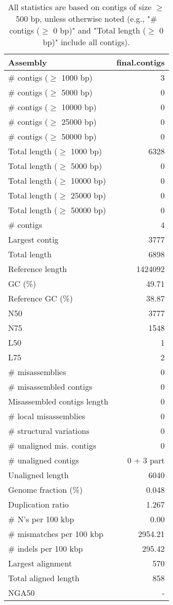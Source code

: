 \documentclass[12pt,a4paper]{article}
\begin{document}
\begin{table}[ht]
\begin{center}
\caption{All statistics are based on contigs of size $\geq$ 500 bp, unless otherwise noted (e.g., "\# contigs ($\geq$ 0 bp)" and "Total length ($\geq$ 0 bp)" include all contigs).}
\begin{tabular}{|l*{1}{|r}|}
\hline
Assembly & final.contigs \\ \hline
\# contigs ($\geq$ 1000 bp) & 3 \\ \hline
\# contigs ($\geq$ 5000 bp) & 0 \\ \hline
\# contigs ($\geq$ 10000 bp) & 0 \\ \hline
\# contigs ($\geq$ 25000 bp) & 0 \\ \hline
\# contigs ($\geq$ 50000 bp) & 0 \\ \hline
Total length ($\geq$ 1000 bp) & 6328 \\ \hline
Total length ($\geq$ 5000 bp) & 0 \\ \hline
Total length ($\geq$ 10000 bp) & 0 \\ \hline
Total length ($\geq$ 25000 bp) & 0 \\ \hline
Total length ($\geq$ 50000 bp) & 0 \\ \hline
\# contigs & 4 \\ \hline
Largest contig & 3777 \\ \hline
Total length & 6898 \\ \hline
Reference length & 1424092 \\ \hline
GC (\%) & 49.71 \\ \hline
Reference GC (\%) & 38.87 \\ \hline
N50 & 3777 \\ \hline
N75 & 1548 \\ \hline
L50 & 1 \\ \hline
L75 & 2 \\ \hline
\# misassemblies & 0 \\ \hline
\# misassembled contigs & 0 \\ \hline
Misassembled contigs length & 0 \\ \hline
\# local misassemblies & 0 \\ \hline
\# structural variations & 0 \\ \hline
\# unaligned mis. contigs & 0 \\ \hline
\# unaligned contigs & 0 + 3 part \\ \hline
Unaligned length & 6040 \\ \hline
Genome fraction (\%) & 0.048 \\ \hline
Duplication ratio & 1.267 \\ \hline
\# N's per 100 kbp & 0.00 \\ \hline
\# mismatches per 100 kbp & 2954.21 \\ \hline
\# indels per 100 kbp & 295.42 \\ \hline
Largest alignment & 570 \\ \hline
Total aligned length & 858 \\ \hline
NGA50 & - \\ \hline
\end{tabular}
\end{center}
\end{table}
\end{document}
